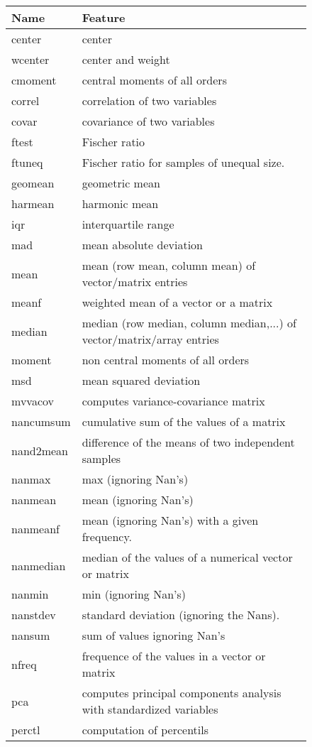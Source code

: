 \begin{figure}[htbp]
\begin{tabular}{|l|l|}
\hline
Name & Feature\\
\hline
center & center \\
wcenter & center and weight \\
cmoment & central moments of all orders \\
correl & correlation of two variables \\
covar & covariance of two variables \\
ftest & Fischer ratio \\
ftuneq & Fischer ratio for samples of unequal size. \\
geomean & geometric mean \\
harmean & harmonic mean \\
iqr & interquartile range \\
mad & mean absolute deviation \\
mean & mean (row mean, column mean) of vector/matrix entries \\
meanf & weighted mean of a vector or a matrix \\
median & median (row median, column median,...) of vector/matrix/array entries \\
moment & non central moments of all orders \\
msd & mean squared deviation \\
mvvacov & computes variance-covariance matrix \\
nancumsum & cumulative sum of the values of a matrix \\
nand2mean & difference of the means of two independent samples \\
nanmax & max (ignoring Nan's) \\
nanmean & mean (ignoring Nan's) \\
nanmeanf & mean (ignoring Nan's) with a given frequency. \\
nanmedian & median of the values of a numerical vector or matrix \\
nanmin & min (ignoring Nan's) \\
nanstdev & standard deviation (ignoring the Nans). \\
nansum & sum of values ignoring Nan's \\
nfreq & frequence of the values in a vector or matrix \\
pca & computes principal components analysis with standardized variables \\
perctl & computation of percentils \\

\end{tabular}
\end{figure}

